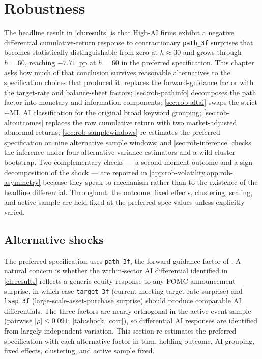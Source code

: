 \chapter{Robustness}
\label{ch:robustness}

The headline result in \cref{ch:results} is that High-AI firms exhibit
a negative differential cumulative-return response to contractionary
\texttt{path\_3f} surprises that becomes statistically distinguishable
from zero at $h \approx 30$ and grows through $h = 60$, reaching
$-7.71$~pp at $h = 60$ in the preferred specification. This chapter
asks how much of that conclusion survives reasonable alternatives to
the specification choices that produced it. 
replaces the forward-guidance factor with the target-rate and
balance-sheet factors; \cref{sec:rob-pathinfo} decomposes the path
factor into monetary and information components;
\cref{sec:rob-altai} swaps the strict$+$ML AI classification for the
original broad keyword grouping; \cref{sec:rob-altoutcomes} replaces
the raw cumulative return with two market-adjusted abnormal returns;
\cref{sec:rob-samplewindows} re-estimates the preferred specification
on nine alternative sample windows; and \cref{sec:rob-inference}
checks the inference under four alternative variance estimators and
a wild-cluster bootstrap. Two complementary checks --- a
second-moment outcome and a sign-decomposition of the shock --- are
reported in \cref{app:rob-volatility,app:rob-asymmetry} because they
speak to mechanism rather than to the existence of the headline
differential. Throughout, the outcome, fixed effects, clustering,
scaling, and active sample are held fixed at the preferred-spec
values unless explicitly varied.

\section{Alternative shocks}
\label{sec:rob-altshocks}

The preferred specification uses \texttt{path\_3f}, the
forward-guidance factor of \citet{swanson2021}. A natural concern is
whether the within-sector AI differential identified in
\cref{ch:results} reflects a generic equity response to any FOMC
announcement surprise, in which case \texttt{target\_3f}
(current-meeting target-rate surprise) and \texttt{lsap\_3f}
(large-scale-asset-purchase surprise) should produce comparable AI
differentials. The three factors are nearly orthogonal in the active
event sample (pairwise $|\rho| \leq 0.091$; \cref{tab:shock_corr}),
so differential AI responses are identified from largely independent
variation. This section re-estimates the preferred specification with
each alternative factor in turn, holding outcome, AI grouping, fixed
effects, clustering, and active sample fixed.

